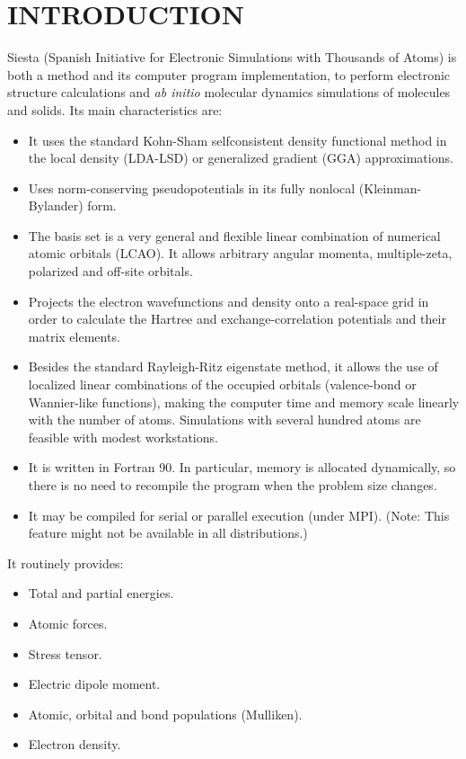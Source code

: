 \documentclass[11pt]{article}
\begin{document}

\tableofcontents

\newpage



\section{INTRODUCTION}

{\sc Siesta} (Spanish Initiative for 
Electronic Simulations with
Thousands of Atoms) is both a method and its computer program implementation,
to perform electronic structure calculations and {\it ab initio} molecular 
dynamics simulations of molecules and solids. Its main characteristics are:
\begin{itemize}
\item
It uses the standard Kohn-Sham selfconsistent density functional
method in the local density (LDA-LSD) or generalized gradient (GGA)
approximations.
\item
Uses norm-conserving pseudopotentials in its fully nonlocal
(Kleinman-Bylander) form.
\item
The basis set is a very general and flexible linear combination of 
numerical atomic orbitals (LCAO). It allows arbitrary angular
momenta, multiple-zeta, polarized and off-site orbitals.
\item
Projects the electron wavefunctions and density onto a real-space
grid in order to calculate the Hartree and exchange-correlation
potentials and their matrix elements.
\item
Besides the standard Rayleigh-Ritz eigenstate method, it allows
the use of localized linear combinations of the occupied orbitals
(valence-bond or Wannier-like functions), making the computer
time and memory scale linearly with the number of atoms.
Simulations with several hundred atoms are feasible with
modest workstations.
\item
It is written in Fortran 90. In particular, memory is allocated
dynamically, so there is no need to recompile the program when
the problem size changes.

\item
It may be compiled for serial or parallel execution (under MPI).
(Note: This feature might not be available in all distributions.)

\end{itemize}

It routinely provides:
\begin{itemize}
\item Total and partial energies.
\item Atomic forces.
\item Stress tensor.
\item Electric dipole moment.
\item Atomic, orbital and bond populations (Mulliken).
\item Electron density.
\end{itemize}
\end{document}
